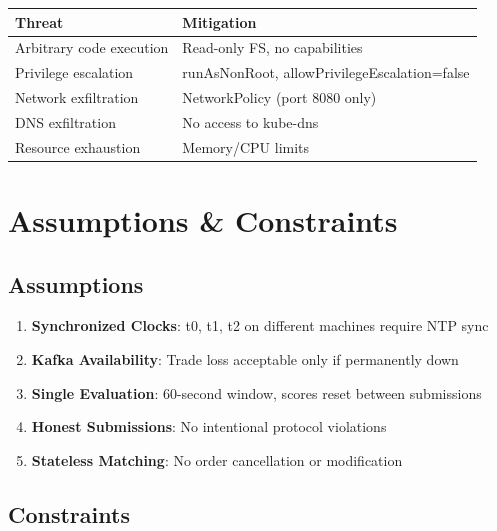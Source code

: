 \documentclass[10pt,a4paper,oneside]{report}
\begin{document}
\begin{table}[H]\small
    \centering
    \begin{tabular}{ll}
    \toprule
    \textbf{Threat} & \textbf{Mitigation} \\
    \midrule
    Arbitrary code execution & Read-only FS, no capabilities \\
    Privilege escalation & runAsNonRoot, allowPrivilegeEscalation=false \\
    Network exfiltration & NetworkPolicy (port 8080 only) \\
    DNS exfiltration & No access to kube-dns \\
    Resource exhaustion & Memory/CPU limits \\
    \bottomrule
    \end{tabular}
\end{table}

\chapter{Assumptions \& Constraints}

\section{Assumptions}

\begin{enumerate}
    \item \textbf{Synchronized Clocks}: t0, t1, t2 on different machines require NTP sync
    \item \textbf{Kafka Availability}: Trade loss acceptable only if permanently down
    \item \textbf{Single Evaluation}: 60-second window, scores reset between submissions
    \item \textbf{Honest Submissions}: No intentional protocol violations
    \item \textbf{Stateless Matching}: No order cancellation or modification
\end{enumerate}

\section{Constraints}
\end{document}
